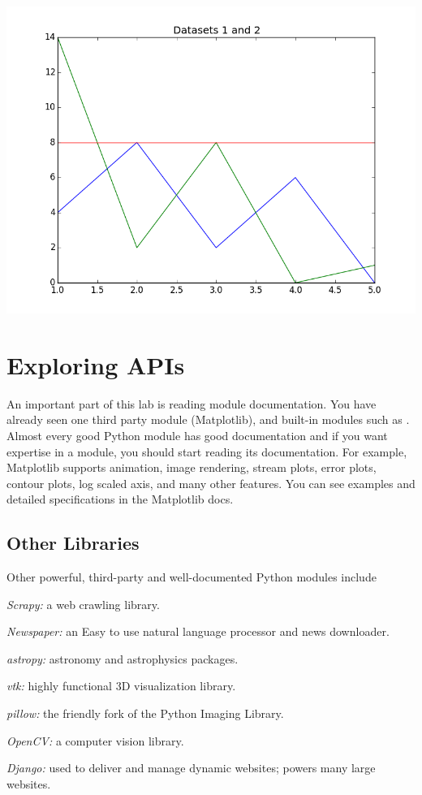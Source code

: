 \documentclass[11pt]{cselabheader}
\begin{document}
\begin{center}
\includegraphics[width=\textwidth]{img/matplotlib_overlayed.png}
\end{center}

\section{Exploring APIs}
An important part of this lab is reading module documentation. You
have already seen one third party module (Matplotlib), and
built-in modules such as . Almost every good Python
module has good documentation and if you want expertise in a module,
you should start reading its documentation.  For example, Matplotlib
supports animation, image rendering, stream plots, error plots,
contour plots, log scaled axis, and many other features. You can see
examples and detailed specifications in the Matplotlib docs.

\subsection{Other Libraries}
Other powerful, third-party and well-documented Python modules include
\begin{inparaenum}
\item \textsl{Scrapy:} a web crawling library.
\item \textsl{Newspaper:} an Easy to use natural language processor and news downloader.
\item \textsl{astropy:} astronomy and astrophysics packages.
\item \textsl{vtk:} highly functional 3D visualization library.
\item \textsl{pillow:} the friendly fork of the Python Imaging Library.
\item \textsl{OpenCV:} a computer vision library.
\item \textsl{Django:} used to deliver and manage dynamic websites; powers many large websites.
\end{inparaenum}
\end{document}
